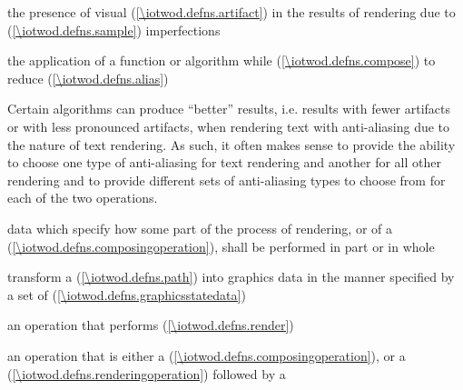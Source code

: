 %
the presence of visual  (\ref{\iotwod.defns.artifact}) in the results of rendering due to  (\ref{\iotwod.defns.sample}) imperfections

%
the application of a function or algorithm while  (\ref{\iotwod.defns.compose}) to reduce  (\ref{\iotwod.defns.alias})
\begin{note}
Certain algorithms can produce ``better'' results, i.e. results with fewer artifacts or with less pronounced artifacts, when rendering text with anti-aliasing due to the nature of text rendering. As such, it often makes sense to provide the ability to choose one type of anti-aliasing for text rendering and another for all other rendering and to provide different sets of anti-aliasing types to choose from for each of the two operations.
\end{note}

%
data which specify how some part of the process of rendering, or of a  (\ref{\iotwod.defns.composingoperation}), shall be performed in part or in whole

%
transform a  (\ref{\iotwod.defns.path}) into graphics data in the manner specified by a set of  (\ref{\iotwod.defns.graphicsstatedata})

%
an operation that performs  (\ref{\iotwod.defns.render})

%
an operation that is either a  (\ref{\iotwod.defns.composingoperation}), or a  (\ref{\iotwod.defns.renderingoperation}) followed by a 

%

%
%

